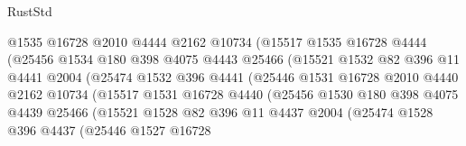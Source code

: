 \begin{lexlean}{RustStd}
\begin{coremodule}
                            @1535
                            @16728
                            @2010
                            @4444
                            @2162
                            @10734
                            (@15517
                              @1535
                              @16728
                              @4444
                              (@25456
                                @1534
                                @180
                                @398
                                @4075
                                @4443
                                @25466
                                (@15521
                                  @1532
                                  @82
                                  @396
                                  @11
                                  @4441
                                  @2004
                                  (@25474
                                    @1532
                                    @396
                                    @4441
                                    (@25446
                                      @1531
                                      @16728
                                      @2010
                                      @4440
                                      @2162
                                      @10734
                                      (@15517
                                        @1531
                                        @16728
                                        @4440
                                        (@25456
                                          @1530
                                          @180
                                          @398
                                          @4075
                                          @4439
                                          @25466
                                          (@15521
                                            @1528
                                            @82
                                            @396
                                            @11
                                            @4437
                                            @2004
                                            (@25474
                                              @1528
                                              @396
                                              @4437
                                              (@25446
                                                @1527
                                                @16728

\end{coremodule}
\end{lexlean}
